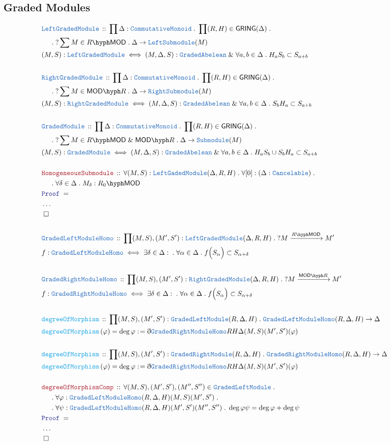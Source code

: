 \documentclass[12pt]{scrartcl}
\newcommand{\TYPE}[1]{\textcolor{NavyBlue}{\mathtt{#1}}}
\newcommand{\FUNC}[1]{\textcolor{Cerulean}{\mathtt{#1}}}
\newcommand{\LOGIC}[1]{\textcolor{Blue}{\mathtt{#1}}}
\newcommand{\THM}[1]{\textcolor{Maroon}{\mathtt{#1}}}
\renewcommand{\.}{\; . \;}
\newcommand{\de}{: \kern 0.1pc =}
\newcommand{\Act}[1]{\left(#1\right)}
\newcommand{\Theorem}[2]{& \THM{#1} \, :: \, #2 \\ & \Proof = \\ }
\newcommand{\DeclareType}[2]{& \TYPE{#1} \, :: \, #2 \\}
\newcommand{\DefineType}[3]{& #1 : \TYPE{#2} \iff #3 \\}
\newcommand{\DeclareFunc}[2]{& \FUNC{#1} \, :: \, #2 \\}
\newcommand{\DefineNamedFunc}[4]{&  \FUNC{#1}\Act{#2} = #3 \de #4 \\}
\newcommand{\NewLine}{\\ & \kern 1pc}
\newcommand{\Page}[1]{ \begin{align*} #1 \end{align*}   }
\newcommand{ \bd }{ \ByDef }
\newcommand{\NoProof}{ & \ldots \\ \EndProof}
\renewcommand{\And}{\; \& \;}
\newcommand{\QED}{\; \square}
\newcommand{\EndProof}{& \QED \\}
\newcommand{\ByDef}{\eth}
\newcommand{\Proof}{\LOGIC{Proof} \; }
\newcommand{\Arrow}[1]{\xrightarrow{#1}}
\newcommand{\LMOD}[1]{#1\hyph\mathsf{MOD}}
\newcommand{\RMOD}[1]{\mathsf{MOD}\hyph#1}
\newcommand{\GA}{\TYPE{GradedAbelean}}
\newcommand{\GRING}{\mathsf{GRING}}
\begin{document}
\subsection{Graded Modules}
\Page{
	\DeclareType{LeftGradedModule}
	{ 
		\prod \Delta : \TYPE{CommutativeMonoid} \.  \prod (R,H) \in \GRING(\Delta) \. 
		\NewLine \. ?\sum M \in \LMOD{R} \. \Delta \to \TYPE{LeftSubmodule}(M)  
	}
	\DefineType{(M,S)}{LeftGradedModule}{ (M,\Delta,S) : \GA \And \forall a,b \in \Delta \.  H_a S_b \subset S_{a+b}  }
	\\
	\DeclareType{RightGradedModule}{ 
		\prod \Delta : \TYPE{CommutativeMonoid} \.  \prod (R,H) \in \GRING(\Delta) \. 
		\NewLine \. ?\sum M \in \RMOD{R} \. \Delta \to \TYPE{RightSubmodule}(M)  
		}
	\DefineType{(M,S)}{RightGradedModule}{ (M,\Delta,S) : \GA \And \forall a,b \in \Delta \.   S_b H_a \subset S_{a+b}  }
	\\
	\DeclareType{GradedModule}{
		\prod \Delta : \TYPE{CommutativeMonoid} \. \prod (R,H) \in \GRING(\Delta) \.  
		\NewLine \. ?\sum M \in \LMOD{R} \And \RMOD{R} \. \Delta \to \TYPE{Submodule}(M) 
	}
	\DefineType{(M,S)}{GradedModule}{ (M,\Delta,S) : \GA \And \forall a,b \in \Delta \.   H_aS_b \cup S_bH_a  \subset S_{a+b}  }
	\\
	\Theorem{HomogeneousSubmodule}{
		\forall (M,S) : \TYPE{LeftGadedModule}(\Delta,R,H) \. 
		\forall [0] : (\Delta  : \TYPE{Cancelable}) \. \NewLine \.  
		\forall \delta \in \Delta \.
		M_\delta : \LMOD{R_0}
	}
	\NoProof
	\\
	\DeclareType{GradedLeftModuleHomo}{ 
		\prod (M,S),(M',S') : \TYPE{LeftGradedModule}(\Delta,R,H) \.
		? M \Arrow{\LMOD{R}} M'                            
	}
	\DefineType{f}{GradedLeftModuleHomo}{  
		\exists \delta \in \Delta : \. 
		\forall \alpha \in \Delta \.  
		f\Big(  S_\alpha \Big) \subset  S_{\alpha + \delta}        
	}
	\\
	\DeclareType{GradedRightModuleHomo}{ 
		\prod (M,S),(M',S') : \TYPE{RightGradedModule}(\Delta,R,H) \.
		? M \Arrow{\RMOD{R}} M'                            
	}
	\DefineType{f}{GradedRightModuleHomo}{  
		\exists \delta \in \Delta : \. 
		\forall \alpha \in \Delta \.  
		f\Big(  S_\alpha \Big) \subset  S_{\alpha + \delta}        
	}
	\\
	\DeclareFunc{degreeOfMorphism}{ \prod (M,S),(M',S')  : \TYPE{GradedLeftModule}(R,\Delta,H) \. \TYPE{GradedLeftModuleHomo}(R,\Delta,H) \to \Delta}
	\DefineNamedFunc{degreeOfMorphism}{\varphi}{\deg \varphi}{ \bd \TYPE{GradedRightModuleHomo}{R}{H}{\Delta}(M,S)(M',S')(\varphi) }
	\\
	\DeclareFunc{degreeOfMorphism}{ \prod (M,S),(M',S') : \TYPE{GradedRightModule}(R,\Delta,H) \. \TYPE{GradedRightModuleHomo}(R,\Delta,H) \to \Delta}
	\DefineNamedFunc{degreeOfMorphism}{\varphi}{\deg \varphi}{ \bd \TYPE{GradedRightModuleHomo}{R}{H}{\Delta}(M,S)(M',S')(\varphi) }
	\\
	\Theorem{degreeOfMorphismComp}{
		\forall (M,S),(M',S'),(M'',S'') \in \TYPE{GradedLeftModule} \. \NewLine \.  
		\forall \varphi : \TYPE{GradedLeftModuleHomo}(R,\Delta,H)(M,S)(M',S') \. \NewLine \. 
		\forall \psi  : \TYPE{GradedLeftModuleHomo}(R,\Delta,H)(M',S')(M'',S'') \. 
		\deg \varphi \psi = \deg \varphi + \deg \psi
	}
	\NoProof
}
\end{document}
